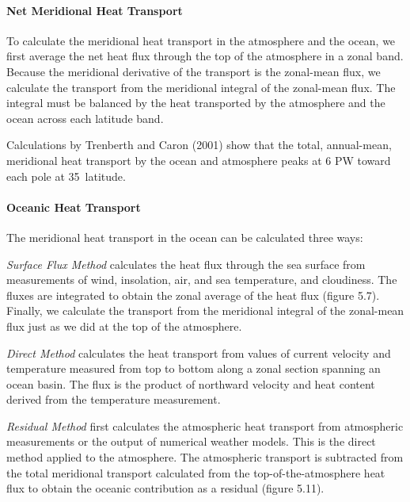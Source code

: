 \paragraph{Net Meridional Heat Transport}
To calculate the meridional heat transport in the atmosphere and
the ocean, we first average the net heat flux through the top of the atmosphere in a zonal band. Because the meridional
derivative of the transport is the zonal-mean flux, we calculate the transport from the
meridional integral of the zonal-mean flux. The integral must be balanced by the heat
transported by the atmosphere and the ocean across each latitude band.

Calculations by Trenberth and Caron (2001) show that the total, annual-mean, meridional heat
transport by the ocean and atmosphere peaks at 6 PW toward each
pole at 35\degrees\ latitude.

\paragraph{Oceanic Heat Transport}
The meridional heat transport
in the ocean can be calculated three ways:
\begin{enumerate}

\vitem \textit{Surface Flux Method} calculates the heat flux through the sea
surface from measurements of wind, insolation, air, and sea
temperature, and cloudiness. The fluxes are integrated to obtain the zonal average of the heat
flux (figure 5.7). Finally, we calculate the transport from the
meridional integral of the zonal-mean flux just as we did at the top of the atmosphere.

\vitem
\textit{Direct Method} 
calculates the heat transport from values of current velocity and temperature
measured from top to bottom along a zonal section spanning an ocean basin. The flux
is the product of northward velocity and heat content derived from the temperature
measurement. 

\vitem \textit{Residual Method}
 first
calculates the atmospheric heat transport from atmospheric measurements or the output of
numerical weather models. This is the direct method applied to the atmosphere. The
atmospheric transport is subtracted from the total meridional transport calculated
from the top-of-the-atmosphere heat flux to
obtain the oceanic contribution as a residual (figure 5.11).
\end{enumerate}

